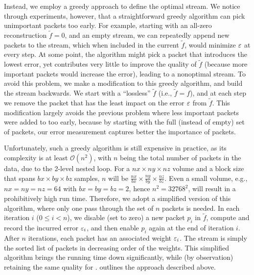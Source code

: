 Instead, we employ a greedy approach to define the optimal stream. We notice through experiments,
however, that a straightforward greedy algorithm can pick unimportant packets too early. For
example, starting with an all-zero reconstruction $\tilde{f}=0$, and an empty stream, we can
repeatedly append new packets to the stream, which when included in the current $\tilde{f}$, would
minimize $\err$ at every step. At some point, the algorithm might pick a packet that introduces the
lowest error, yet contributes very little to improve the quality of $\tilde{f}$ (because more
important packets would increase the error), leading to a nonoptimal stream. To avoid this problem,
we make a modification to this greedy algorithm, and build the stream backwards. We start with a
``lossless'' $\tilde{f}$ (i.e., $\tilde{f}=f$), and at each step we remove the packet that has the
least impact on the error $\err$ from $\tilde{f}$. This modification largely avoids the previous
problem where less important packets were added to \sopt too early, because by starting with the
full (instead of empty) set of packets, our error measurement captures better the importance of
packets.

Unfortunately, such a greedy algorithm is still expensive in practice, as its complexity is at least
$\mathcal{O}(n^2)$, with $n$ being the total number of packets in the data, due to the 2-level
nested loop. For a $nx\times ny \times nz$ volume and a block size that spans $bx\times by\times bz$
samples, $n$ will be $\frac{nx}{bx}\times \frac{ny}{by}\times \frac{nz}{bz}$. Even a small volume,
e.g., $nx=ny=nz=64$ with $bx=by=bz=2$, hence $n^2=32768^2$, will result in a prohibitively high
run time. Therefore, we adopt a simplified version of this algorithm, where only one pass through
the set of $n$ packets is needed. In each iteration $i$ ($0\leq i < n$), we disable (set to zero) a
new packet $p_i$ in $\tilde{f}$, compute and record the incurred error $\err_i$, and then enable
$p_i$ again at the end of iteration $i$. After $n$ iterations, each packet has an associated weight
$\err_i$. The stream \sopt is simply the sorted list of packets in decreasing order of the
weights. This simplified algorithm brings the running time down significantly, while (by
observation) retaining the same quality for \sopt.  outlines the approach described
above.

